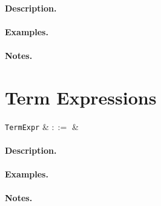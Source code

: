 \paragraph{Description.}

\paragraph{Examples.}

\paragraph{Notes.} 


\section{Term Expressions}

\begin{syntax}
  \verb+TermExpr+ & $::=$ &\\
\end{syntax}

\paragraph{Description.}

\paragraph{Examples.}

\paragraph{Notes.} 



